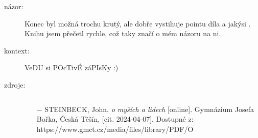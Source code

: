 \documentclass{article}
\begin{document}
\begin{description}
\begin{description}
        \end{description}
    \item[názor:] Konec byl možná trochu krutý, ale dobře vystihuje pointu díla a jakýsi . Knihu jsem přečetl rychle, což taky značí o mém názoru na ni. 
    \item[kontext:] VeDU si POcTivÉ záPIsKy :)
    \item[zdroje:] $ $
    \begin{itemize}
        \setlength\itemsep{0em}
        \item[$-$] STEINBECK, John. \textit{o myších a lidech} [online]. Gymnázium Josefa Bořka, Česká Těšín, [cit. 2024-04-07]. Dostupné z: https://www.gmct.cz/media/files/library/PDF/O%
    \end{itemize}
\end{description}
\end{document}
